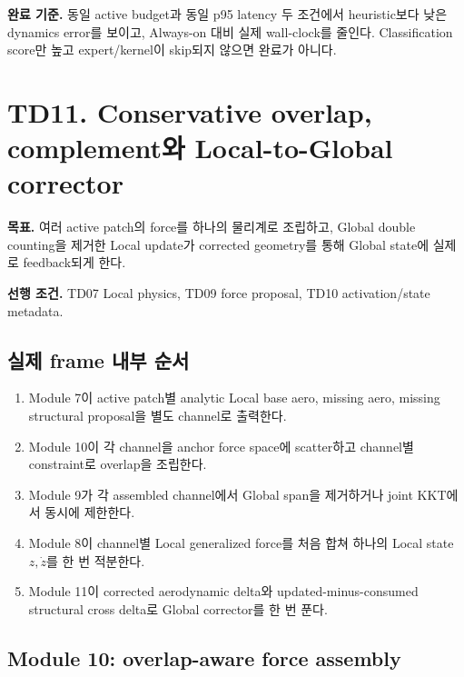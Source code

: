 \documentclass[10pt,a4paper]{article}
\begin{document}
\textbf{완료 기준.}
동일 active budget과 동일 p95 latency 두 조건에서 heuristic보다 낮은 dynamics error를 보이고,
Always-on 대비 실제 wall-clock를 줄인다. Classification score만 높고 expert/kernel이 skip되지 않으면 완료가 아니다.

\section{TD11. Conservative overlap, complement와 Local-to-Global corrector}

\textbf{목표.}
여러 active patch의 force를 하나의 물리계로 조립하고,
Global double counting을 제거한 Local update가 corrected geometry를 통해 Global state에 실제로 feedback되게 한다.

\textbf{선행 조건.} TD07 Local physics, TD09 force proposal, TD10 activation/state metadata.

\subsection*{실제 frame 내부 순서}

\begin{enumerate}
  \item Module 7이 active patch별 analytic Local base aero, missing aero, missing structural proposal을 별도 channel로 출력한다.
  \item Module 10이 각 channel을 anchor force space에 scatter하고 channel별 constraint로 overlap을 조립한다.
  \item Module 9가 각 assembled channel에서 Global span을 제거하거나 joint KKT에서 동시에 제한한다.
  \item Module 8이 channel별 Local generalized force를 처음 합쳐 하나의 Local state \(z,\dot z\)를 한 번 적분한다.
  \item Module 11이 corrected aerodynamic delta와 updated-minus-consumed structural cross delta로 Global corrector를 한 번 푼다.
\end{enumerate}

\subsection*{Module 10: overlap-aware force assembly}
\end{document}
